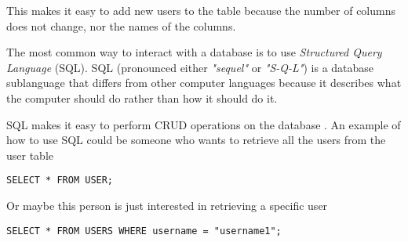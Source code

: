 This makes it easy to add new users to the table because the number of columns does not change, nor the names of the columns.

The most common way to interact with a database is to use \textit{Structured Query Language} (SQL).
SQL (pronounced either \textit{"sequel"} or \textit{"S-Q-L"}) is a database sublanguage that differs from other computer languages because it describes what the computer should do rather than how it should do it. \cite{SQLIntroduction}

SQL makes it easy to perform CRUD operations on the database \cite{OracleWhatIsDatabase}.
An example of how to use SQL could be someone who wants to retrieve all the users from the user table

\begin{lstlisting}
SELECT * FROM USER;
\end{lstlisting}

Or maybe this person is just interested in retrieving a specific user

\begin{lstlisting}
SELECT * FROM USERS WHERE username = "username1";
\end{lstlisting}



